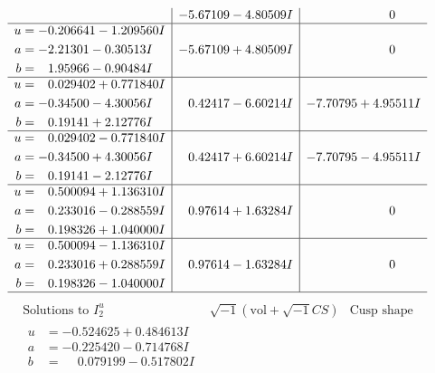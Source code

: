 \documentclass[1p]{elsarticle_modified}
\theoremstyle{definition}
\newcommand{\I}{\sqrt{-1}}
\begin{document}
$$\begin{array}{c|c|c}
 & -5.67109 - 4.80509 I & \phantom{-0.000000 } 0 \\ \hline\begin{aligned}
u &= -0.206641 - 1.209560 I \\
a &= -2.21301 - 0.30513 I \\
b &= \phantom{-}1.95966 - 0.90484 I\end{aligned}
 & -5.67109 + 4.80509 I & \phantom{-0.000000 } 0 \\ \hline\begin{aligned}
u &= \phantom{-}0.029402 + 0.771840 I \\
a &= -0.34500 - 4.30056 I \\
b &= \phantom{-}0.19141 + 2.12776 I\end{aligned}
 & \phantom{-}0.42417 - 6.60214 I & -7.70795 + 4.95511 I \\ \hline\begin{aligned}
u &= \phantom{-}0.029402 - 0.771840 I \\
a &= -0.34500 + 4.30056 I \\
b &= \phantom{-}0.19141 - 2.12776 I\end{aligned}
 & \phantom{-}0.42417 + 6.60214 I & -7.70795 - 4.95511 I \\ \hline\begin{aligned}
u &= \phantom{-}0.500094 + 1.136310 I \\
a &= \phantom{-}0.233016 - 0.288559 I \\
b &= \phantom{-}0.198326 + 1.040000 I\end{aligned}
 & \phantom{-}0.97614 + 1.63284 I & \phantom{-0.000000 } 0 \\ \hline\begin{aligned}
u &= \phantom{-}0.500094 - 1.136310 I \\
a &= \phantom{-}0.233016 + 0.288559 I \\
b &= \phantom{-}0.198326 - 1.040000 I\end{aligned}
 & \phantom{-}0.97614 - 1.63284 I & \phantom{-0.000000 } 0\\
 \hline 
 \end{array}$$\newpage$$\begin{array}{c|c|c}  
\text{Solutions to }I^u_{2}& \I (\text{vol} + \sqrt{-1}CS) & \text{Cusp shape}\\
 \hline 
\begin{aligned}
u &= -0.524625 + 0.484613 I \\
a &= -0.225420 - 0.714768 I \\
b &= \phantom{-}0.079199 - 0.517802 I\end{aligned}

\end{array}$$
\end{document}
